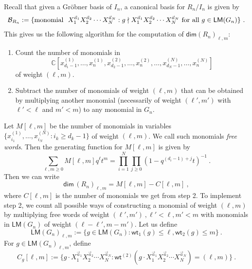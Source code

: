 \documentclass[a4paper,10pt]{article}
\newcommand{\C}{\mathds{C}}
\newcommand{\mr}[1]{\mathsf{#1}}
\def\CB{{\cal B}}
\def\CB {{\cal B}}
\begin{document}
\begin{appendix}
Recall that given a Gr\"{o}bner basis of $I_n$, a canonical basis for $R_n/I_n$ is given by 
\begin{equation}
    \CB_{R_n}:=\{\text{monomial}~~X_1^{\vec{a}_1}X_2^{\vec{a}_2}\cdots X_N^{\vec{a}_N}:g\nmid X_1^{\vec{a}_1}X_2^{\vec{a}_2}\cdots X_N^{\vec{a}_N}\text{ for all }g\in \mr{LM}(G_n)\}~.
\end{equation}
This gives us the following algorithm for the computation of $\mr{dim}\left(R_n\right)_{\ell, m}$:
\begin{enumerate}
    \item Count the number of monomials in 
    \begin{equation}
        \C[x^{(1)}_{d_1-1},\dots,x^{(1)}_n,x^{(2)}_{d_2-1},\dots,x^{(2)}_n,\dots,x^{(N)}_{d_N-1},\dots,x^{(N)}_n]
    \end{equation}
    of weight $(\ell,m)$. 
    \item Subtract the number of monomials of weight $(\ell,m)$ that can be obtained by multiplying another monomial (necessarily of weight $(\ell',m')$ with $\ell'<\ell$ and $m'<m$) to any monomial in $G_n$.
\end{enumerate}
Let $M[\ell,m]$ be the number of monomials in variables $\{x^{(1)}_{i_1},\dots,x^{(N)}_{i_N}:i_k\geq d_{k}-1\}$ of weight $(\ell,m)$. We call such monomials \textit{free words}. Then the generating function for $M[\ell,m]$ is given by
\begin{equation}\label{eq:gen_free_words}
    \sum_{\ell,m\geq0}M[\ell,m]q^\ell t^m=\prod_{i=1}^N\prod_{j\geq 0}\left(1-q^{(d_i-1)+j}t\right)^{-1}~.
\end{equation}
Then we can write 
\begin{equation}
\mr{dim}\,(R_n)_{\ell,m}=M[\ell,m]-C[\ell,m]~,    
\end{equation}
where $C[\ell,m]$ is the number of monomials we get from step 2. 
To implement step 2, we count all possible ways of constructing a monomial of weight $(\ell,m)$ by multiplying free words of weight $(\ell',m')~,\ell'<\ell,m'<m$ with monomials in $\mr{LM}(G_n)$ of weight $(\ell-\ell',m-m')$. Let us define 
\begin{equation}
\mr{LM}(G_n)_{\ell,m}:=\{g\in\mr{LM}(G_n):\mr{wt}_1(g)\leq \ell,\mr{wt}_2(g)\leq m\}~.    
\end{equation}
For $g\in \mr{LM}(G_n)_{\ell,m}$, define  
\begin{equation}
C_g[\ell,m]:=\{g\cdot X_1^{\vec{a}_1}X_2^{\vec{a}_2}\cdots X_N^{\vec{a}_N}:\mr{wt}^{(2)}(g\cdot X_1^{\vec{a}_1}X_2^{\vec{a}_2}\cdots X_N^{\vec{a}_N})=(\ell,m) \}~.

\end{equation}
\end{appendix}
\end{document}
